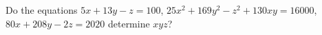 Do the equations $5x+13y-z=100$, $25x^2+169y^2-z^2+130xy=16000$, $80x+208y-2z=2020$ determine $xyz$?
